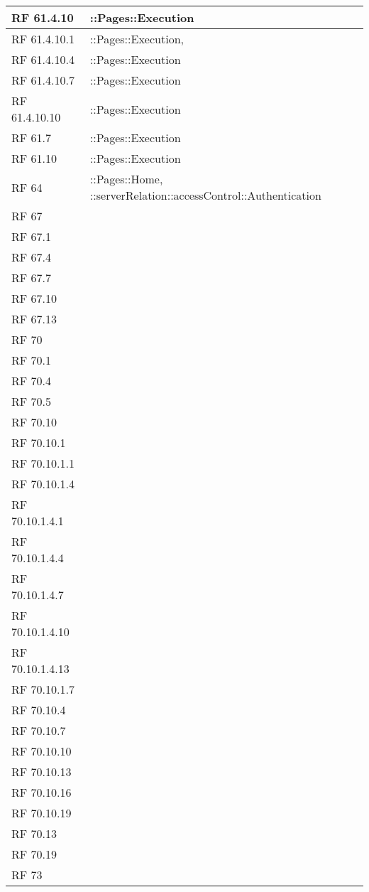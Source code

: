 {\begin{longtable} [c]{| p{2cm} | p{13cm} |}
 \hline 
RF 61.4.10 & ::\-Pages::\-Execution\\ 
 \hline 
RF 61.4.10.1 & ::\-Pages::\-Execution, \\ 
 \hline 
RF 61.4.10.4 & ::\-Pages::\-Execution\\ 
 \hline 
RF 61.4.10.7 & ::\-Pages::\-Execution\\ 
 \hline 
RF 61.4.10.10 & ::\-Pages::\-Execution\\ 
 \hline 
RF 61.7 & ::\-Pages::\-Execution\\ 
 \hline 
RF 61.10 & ::\-Pages::\-Execution\\ 
 \hline 
RF 64 & ::\-Pages::\-Home, ::\-serverRelation::\-accessControl::\-Authentication\\ 
 \hline 
RF 67 & \\ 
 \hline 
RF 67.1 & \\ 
 \hline 
RF 67.4 & \\ 
 \hline 
RF 67.7 & \\ 
 \hline 
RF 67.10 & \\ 
 \hline 
RF 67.13 & \\ 
 \hline 
RF 70 & \\ 
 \hline 
RF 70.1 & \\ 
 \hline 
RF 70.4 & \\ 
 \hline 
RF 70.5 & \\ 
 \hline 
RF 70.10 & \\ 
 \hline 
RF 70.10.1 & \\ 
 \hline 
RF 70.10.1.1 & \\ 
 \hline 
RF 70.10.1.4 & \\ 
 \hline 
RF 70.10.1.4.1 & \\ 
 \hline 
RF 70.10.1.4.4 & \\ 
 \hline 
RF 70.10.1.4.7 & \\ 
 \hline 
RF 70.10.1.4.10 & \\ 
 \hline 
RF 70.10.1.4.13 & \\ 
 \hline 
RF 70.10.1.7 & \\ 
 \hline 
RF 70.10.4 & \\ 
 \hline 
RF 70.10.7 & \\ 
 \hline 
RF 70.10.10 & \\ 
 \hline 
RF 70.10.13 & \\ 
 \hline 
RF 70.10.16 & \\ 
 \hline 
RF 70.10.19 & \\ 
 \hline 
RF 70.13 & \\ 
 \hline 
RF 70.19 & \\ 
 \hline 
RF 73 & \\ 
 \hline 
\end{longtable}}